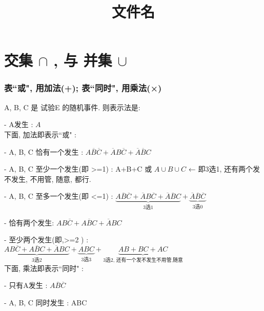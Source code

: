 \documentclass[UTF8]{ctexart}
\title{文件名}
\begin{document}
	\tableofcontents %
	\date{} %
	\maketitle  %
	
	
	
	
	\part{交集 $\cap$ , 与 并集 $\cup$}
	
	
	\section{表``或", 用加法(+); 表``同时", 用乘法(×)}
	
	A, B, C 是 试验E 的随机事件. 则表示法是:
	
	- A发生 : $A$ \\
	
	下面, 加法即表示``或" :
	
	- A, B, C 恰有一个发生 : $A\overline{B}\overline{C}+\overline{A}B\overline{C}+\overline{A}\overline{B}C$
	
	- A, B, C 至少一个发生(即 >=1) : A+B+C 或 $A{\cup}B{\cup}C$ ← 即3选1, 还有两个发不发生, 不用管, 随意, 都行.
	
	- A, B, C 至多一个发生(即 <=1) : $\underset{3\text{选}1}{\underbrace{A\overline{B}\overline{C}+\overline{A}B\overline{C}+\overline{A}\overline{B}C}}+\underset{3\text{选}0}{\underbrace{\overline{A}\overline{B}\overline{C}}}		$
	
	- 恰有两个发生: $AB \overline{C} + A \overline{B} C + \overline{A} BC $
	
	- 至少两个发生(即,>=2 ) : $\underset{3\text{选}2}{\underbrace{AB\overline{C}+A\overline{B}C+\overline{A}BC}}+\underset{3\text{选}3}{\underbrace{ABC}}+\underset{3\text{选2,\ 还有一个发不发生不用管,随意}}{\underbrace{AB+BC+AC}}	$	\\
	
	
	
	下面, 乘法即表示``同时" :	
	
	- 只有A发生 : $A\overline{B}\overline{C}$	
	
	- A, B, C 同时发生 : ABC  \\
	
\end{document}
